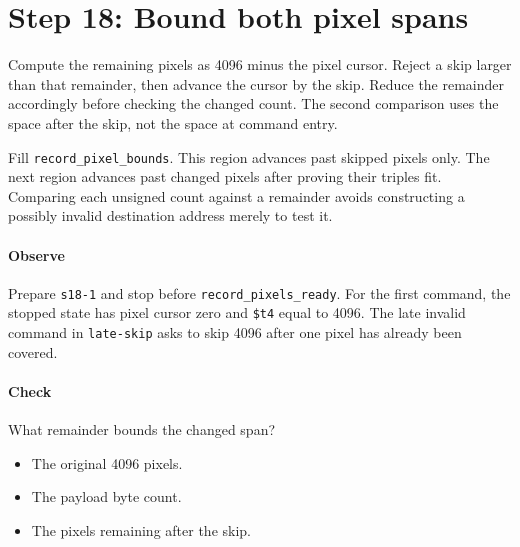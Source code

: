 \section{Step 18: Bound both pixel spans}
Compute the remaining pixels as 4096 minus the pixel cursor. Reject a skip
larger than that remainder, then advance the cursor by the skip. Reduce the
remainder accordingly before checking the changed count. The second comparison
uses the space after the skip, not the space at command entry.

Fill \texttt{record\_pixel\_bounds}. This region advances past skipped pixels
only. The next region advances past changed pixels after proving their triples
fit. Comparing each unsigned count against a remainder avoids constructing a
possibly invalid destination address merely to test it.

\paragraph{Observe} Prepare \texttt{s18-1} and stop before
\texttt{record\_pixels\_ready}. For the first command, the stopped state has
pixel cursor zero and \texttt{\$t4} equal to 4096. The late invalid command
in \texttt{late-skip} asks to skip 4096 after one pixel has already been covered.

\paragraph{Check} What remainder bounds the changed span?
\begin{itemize}
  \item[A.] The original 4096 pixels.
  \item[B.] The payload byte count.
  \item[C.] The pixels remaining after the skip.
\end{itemize}
